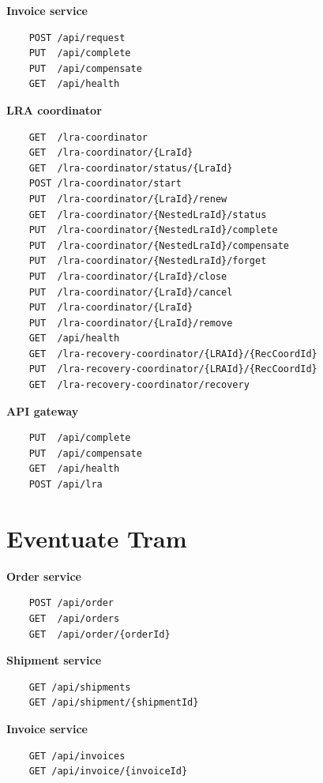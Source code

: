 \documentclass[oneside,
  digital, %
  table,   %
  nolof,     %
  nolot,     %
]{fithesis3}
\begin{document}
\noindent
\textbf{Invoice service}

\begin{verbatim}
    POST /api/request
    PUT  /api/complete
    PUT  /api/compensate
    GET  /api/health
\end{verbatim}

\noindent
\textbf{LRA coordinator}

\begin{verbatim}
    GET  /lra-coordinator
    GET  /lra-coordinator/{LraId}
    GET  /lra-coordinator/status/{LraId}
    POST /lra-coordinator/start
    PUT  /lra-coordinator/{LraId}/renew
    GET  /lra-coordinator/{NestedLraId}/status
    PUT  /lra-coordinator/{NestedLraId}/complete
    PUT  /lra-coordinator/{NestedLraId}/compensate
    PUT  /lra-coordinator/{NestedLraId}/forget
    PUT  /lra-coordinator/{LraId}/close
    PUT  /lra-coordinator/{LraId}/cancel
    PUT  /lra-coordinator/{LraId}
    PUT  /lra-coordinator/{LraId}/remove
    GET  /api/health
    GET  /lra-recovery-coordinator/{LRAId}/{RecCoordId}
    PUT  /lra-recovery-coordinator/{LRAId}/{RecCoordId}
    GET  /lra-recovery-coordinator/recovery
\end{verbatim}

\noindent
\textbf{API gateway}

\begin{verbatim}
    PUT  /api/complete
    PUT  /api/compensate
    GET  /api/health
    POST /api/lra
\end{verbatim}


\section{Eventuate Tram}

\textbf{Order service}

\begin{verbatim}
    POST /api/order
    GET  /api/orders
    GET  /api/order/{orderId}
\end{verbatim}

\noindent
\textbf{Shipment service}

\begin{verbatim}
    GET /api/shipments
    GET /api/shipment/{shipmentId}
\end{verbatim}

\noindent
\textbf{Invoice service}

\begin{verbatim}
    GET /api/invoices
    GET /api/invoice/{invoiceId}
\end{verbatim}
\end{document}
